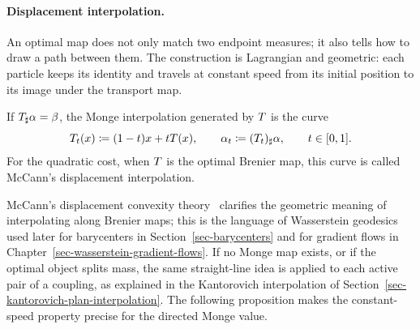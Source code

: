 \paragraph{Displacement interpolation.}
\label{sec-monge-interpolation}

An optimal map does not only match two endpoint measures; it also tells how to draw a path between them. The construction is Lagrangian and geometric: each particle keeps its identity and travels at constant speed from its initial position to its image under the transport map.

\begin{defn}\label{def-monge-mccann-interpolation}
	If $T_\sharp\alpha=\beta$, the Monge interpolation generated by $T$ is the curve
	\[
		T_t(x)\coloneqq(1-t)x+tT(x),
		\qquad
		\alpha_t\coloneqq(T_t)_\sharp\alpha,
		\qquad t\in[0,1].
	\]
	For the quadratic cost, when $T$ is the optimal Brenier map, this curve is called McCann's displacement interpolation.
\end{defn}
McCann's displacement convexity theory~\cite{mccann1997convexity} clarifies the geometric meaning of interpolating along Brenier maps; this is the language of Wasserstein geodesics used later for barycenters in Section~\ref{sec-barycenters} and for gradient flows in Chapter~\ref{sec-wasserstein-gradient-flows}. If no Monge map exists, or if the optimal object splits mass, the same straight-line idea is applied to each active pair of a coupling, as explained in the Kantorovich interpolation of Section~\ref{sec-kantorovich-plan-interpolation}. The following proposition makes the constant-speed property precise for the directed Monge value.

